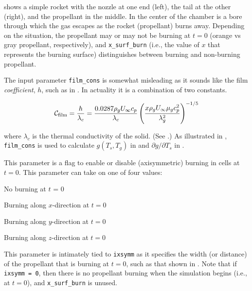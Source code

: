  shows a simple rocket with the nozzle at one end (left), the tail at the other (right), and the propellant in the middle. In the center of the chamber is a bore through which the gas escapes as the rocket (propellant) burns away. Depending on the situation, the propellant may or may not be burning at $t=0$ (orange vs gray propellant, respectively), and \texttt{x\_surf\_burn} (i.e., the value of $x$ that represents the burning surface) distinguishes between burning and non-burning propellant.

 The input parameter \texttt{film\_cons} is somewhat misleading as it sounds like the film {\it coefficient}, $h$, such as in . In actuality it is a combination of two constants.

\begin{equation}
{\cal C_{\rm film}} = \frac{h}{\lambda_c} = \frac{0.0287\rho_g U_\infty c_p}{\lambda_c}\left(x\rho_g U_\infty\mu_g c_p^2\over \lambda_g^2\right)^{-1/5}
\end{equation}

where $\lambda_c$ is the thermal conductivity of the solid. (See .) As illustrated in , \texttt{film\_cons} is used to calculate $g(T_s,T_g)$ in  and $\partial g/\partial T_s$ in .

 This parameter is a flag to enable or disable (axisymmetric) burning in cells at $t = 0$. This parameter can take on one of four values:

\begin{description}[labelindent=1.5cm]
\item[0]{No burning at $t$ = 0}
\item[1]{Burning along $x$-direction at $t = 0$}
\item[2]{Burning along $y$-direction at $t = 0$}
\item[3]{Burning along $z$-direction at $t = 0$}
\end{description}

 This parameter is intimately tied to \texttt{ixsymm} as it specifies the width (or distance) of the propellant that is burning at $t=0$, such as that shown in . Note that if \texttt{ixsymm = 0}, then there is no propellant burning when the simulation begins (i.e., at $t=0$), and \texttt{x\_surf\_burn} is unused.


